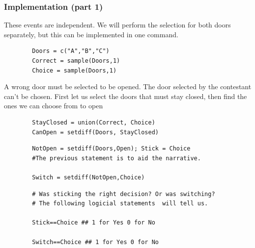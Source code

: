 \documentclass{beamer}
\begin{document}
\begin{frame}[fragile]
	\frametitle{Implementation (part 1)}
	These events are independent. We will perform the selection for both doors separately, but this can be implemented in one command.
	
	
	\begin{framed}
		\begin{verbatim}
		Doors = c("A","B","C")
		Correct = sample(Doors,1)
		Choice = sample(Doors,1)
		\end{verbatim} 
	\end{framed}
\end{frame}
\begin{frame}[fragile]
	A wrong door must be selected to be opened. The door selected by the contestant can't be chosen. First let us select the doors that must stay closed, then find the ones we can choose from to open
	
	\begin{framed}
		\begin{verbatim}
		StayClosed = union(Correct, Choice)
		CanOpen = setdiff(Doors, StayClosed)
		\end{verbatim} 
	\end{framed}
\end{frame}
\begin{frame}[fragile]
	
	\begin{framed}
		\begin{verbatim}
		NotOpen = setdiff(Doors,Open); Stick = Choice        
		#The previous statement is to aid the narrative. 
		
		Switch = setdiff(NotOpen,Choice)
		\end{verbatim} 
	\end{framed}
\end{frame}
\begin{frame}[fragile]
	
	\begin{framed}
		\begin{verbatim}	
		# Was sticking the right decision? Or was switching?
		# The following logicial statements  will tell us.
		
		Stick==Choice ## 1 for Yes 0 for No 
		
		Switch==Choice ## 1 for Yes 0 for No 
		\end{verbatim} 
	\end{framed}
\end{frame}
\end{document}

